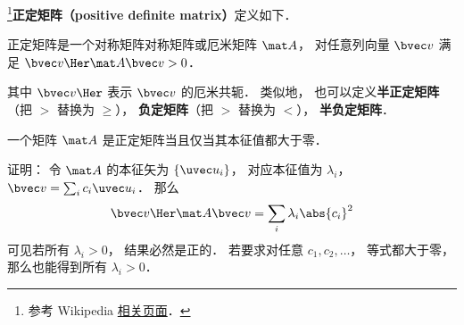 
\begin{issues}
\issueTODO
\end{issues}


\footnote{参考 Wikipedia \href{https://en.wikipedia.org/wiki/Definite_matrix}{相关页面}．}\textbf{正定矩阵（positive definite matrix）}定义如下．
\begin{definition}{}
正定矩阵是一个对称矩阵对称矩阵或厄米矩阵 $\mat A$， 对任意列向量 $\bvec v$ 满足 $\bvec v\Her \mat A \bvec v > 0$．
\end{definition}
其中 $\bvec v\Her$ 表示 $\bvec v$ 的厄米共轭． 类似地， 也可以定义\textbf{半正定矩阵}（把 $>$ 替换为 $\geqslant$）， \textbf{负定矩阵}（把 $>$ 替换为 $<$）， \textbf{半负定矩阵}．

\begin{theorem}{}
一个矩阵 $\mat A$ 是正定矩阵当且仅当其本征值都大于零．
\end{theorem}

证明： 令 $\mat A$ 的本征矢为 $\{\uvec u_i\}$， 对应本征值为 $\lambda_i$， $\bvec v = \sum_i c_i \uvec u_i$． 那么
\begin{equation}
\bvec v\Her \mat A \bvec v = \sum_i \lambda_i \abs{c_i}^2
\end{equation}
可见若所有 $\lambda_i > 0$， 结果必然是正的． 若要求对任意 $c_1,c_2,\dots$， 等式都大于零， 那么也能得到所有 $\lambda_i > 0$．
